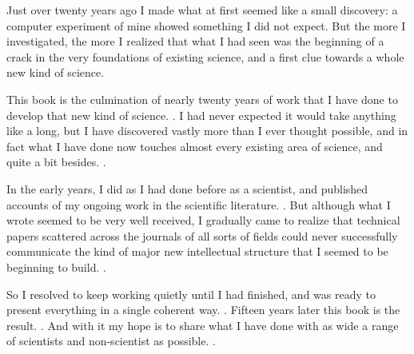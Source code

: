 
Just over twenty years ago I made what at first seemed like a small discovery: a
computer experiment of mine showed something I did not expect.
But the more I investigated, the more I realized that what I had seen was the
beginning of a crack in the very foundations of existing science, and a first
clue towards a whole new kind of science.

This book is the culmination of nearly twenty years of work that I have done to
develop that new kind of science.
.
I had never expected it would take anything like a long, but I have discovered
vastly more than I ever thought possible, and in fact what I have done now
touches almost every existing area of science, and quite a bit besides.
.

In the early years, I did as I had done before as a scientist, and published
accounts of my ongoing work in the scientific literature.
.
But although what I wrote seemed to be very well received, I gradually came to
realize that technical papers scattered across the journals of all sorts of
fields could never successfully communicate the kind of major new intellectual
structure that I seemed to be beginning to build.
.

So I resolved to keep working quietly until I had finished, and was ready to
present everything in a single coherent way.
.
Fifteen years later this book is the result.
.
And with it my hope is to share what I have done with as wide a range of
scientists and non-scientist as possible.
.

